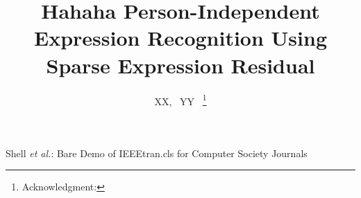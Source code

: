 \documentclass[journal]{IEEEtran}
\begin{document}
%
\title{Hahaha Person-Independent Expression Recognition Using Sparse Expression Residual}
%
%
%

\author{XX,~
				YY~%
\thanks{\IEEEcompsocthanksitem Acknowledgment: \IEEEcompsocthanksitem 

}}


%
{Shell \MakeLowercase{\textit{et al.}}: Bare Demo of
IEEEtran.cls for Computer Society Journals}
\maketitle
\end{document}
